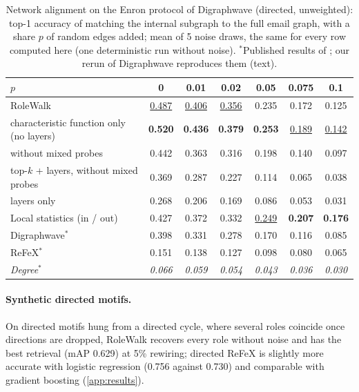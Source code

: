 \documentclass[10pt]{article}
\theoremstyle{definition}
\newcommand{\best}[1]{\textbf{#1}}
\newcommand{\second}[1]{\underline{#1}}
\begin{document}
\begin{table}[t]
\centering
\caption{Network alignment on the Enron protocol of Digraphwave \citep{ceylan2022} (directed, unweighted): top-1 accuracy of matching the internal subgraph to the full email graph, with a share $p$ of random edges added; mean of 5 noise draws, the same for every row computed here (one deterministic run without noise). $^*$Published results of \citep{ceylan2022}; our rerun of Digraphwave reproduces them (text).}
\label{tab:align}
\small
\begin{tabular}{lcccccc}
\toprule
$p$ & 0 & 0.01 & 0.02 & 0.05 & 0.075 & 0.1 \\
\midrule
RoleWalk & \second{0.487} & \second{0.406} & \second{0.356} & 0.235 & 0.172 & 0.125 \\
\quad characteristic function only (no layers) & \best{0.520} & \best{0.436} & \best{0.379} & \best{0.253} & \second{0.189} & \second{0.142} \\
\quad without mixed probes & 0.442 & 0.363 & 0.316 & 0.198 & 0.140 & 0.097 \\
\quad top-$k$ + layers, without mixed probes & 0.369 & 0.287 & 0.227 & 0.114 & 0.065 & 0.038 \\
\quad layers only & 0.268 & 0.206 & 0.169 & 0.086 & 0.053 & 0.031 \\
Local statistics (in / out) & 0.427 & 0.372 & 0.332 & \second{0.249} & \best{0.207} & \best{0.176} \\
Digraphwave$^*$ & 0.398 & 0.331 & 0.278 & 0.170 & 0.116 & 0.085 \\
ReFeX$^*$ & 0.151 & 0.138 & 0.127 & 0.098 & 0.080 & 0.065 \\
\midrule
\emph{Degree}$^*$ & \emph{0.066} & \emph{0.059} & \emph{0.054} & \emph{0.043} & \emph{0.036} & \emph{0.030} \\
\bottomrule
\end{tabular}
\end{table}

\paragraph{Synthetic directed motifs.}
On directed motifs hung from a directed cycle, where several roles coincide once directions are dropped, RoleWalk recovers every role without noise and has the best retrieval (mAP 0.629) at 5\% rewiring; directed ReFeX is slightly more accurate with logistic regression (0.756 against 0.730) and comparable with gradient boosting (\cref{app:results}).
\end{document}
